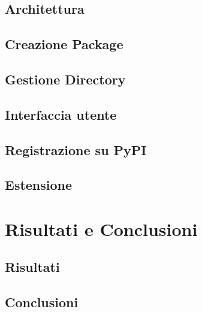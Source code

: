 \documentclass[a4paper,12pt, doubleside]{report}
\begin{document}
        \section{Architettura}
            
        \section{Creazione Package}
        \section{Gestione Directory}
        \section{Interfaccia utente}
        \section{Registrazione su PyPI}
        \section{Estensione}
            
    \chapter{Risultati e Conclusioni}
        \section{Risultati}
        \section{Conclusioni}
\end{document}
